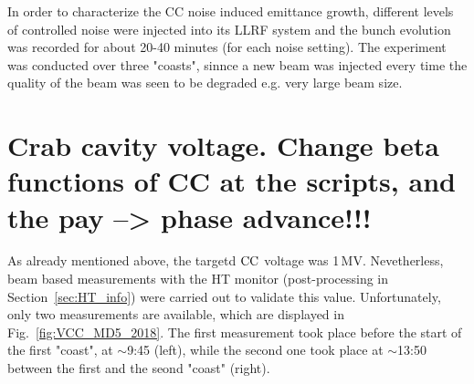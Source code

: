In order to characterize the CC noise induced emittance growth, different levels of controlled noise were injected into its LLRF system and the bunch evolution was recorded for about 20-40 minutes (for each noise setting). The experiment was conducted over three "coasts", sinnce a new beam was injected every time the quality of the beam was seen to be degraded e.g. very large beam size.


\section{Crab cavity voltage. Change beta functions of CC at the scripts, and the pay --> phase advance!!!}\label{sec:CC_voltage_meas2018}

As already mentioned above, the targetd ${\mathrm{CC}}$ voltage was 1\,MV. Nevetherless, beam based measurements with the HT monitor (post-processing in Section~\ref{sec:HT_info}) were carried out to validate this value. Unfortunately, only two measurements are available, which are displayed in Fig.~\ref{fig:VCC_MD5_2018}. The first measurement took place before the start of the first "coast", at $\sim$9:45 (left), while the second one took place at $\sim$13:50 between the first and the seond "coast" (right). 


